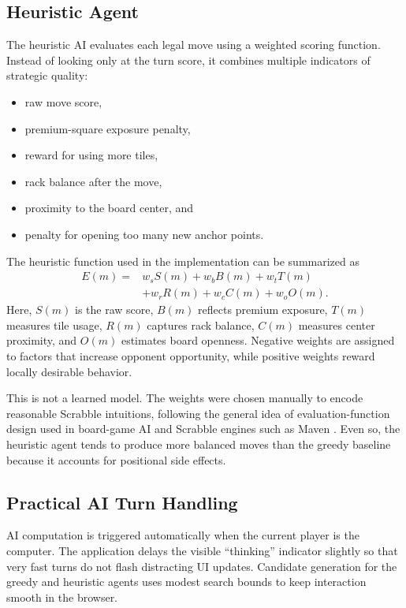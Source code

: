 \documentclass[conference]{IEEEtran}
\begin{document}
\subsection{Heuristic Agent}
The heuristic AI evaluates each legal move using a weighted scoring function. Instead of looking only at the turn score, it combines multiple indicators of strategic quality:
\begin{itemize}
\item raw move score,
\item premium-square exposure penalty,
\item reward for using more tiles,
\item rack balance after the move,
\item proximity to the board center, and
\item penalty for opening too many new anchor points.
\end{itemize}

The heuristic function used in the implementation can be summarized as
\begin{align}
E(m) ={}& w_s S(m) + w_b B(m) + w_t T(m) \nonumber\\
&+ w_r R(m) + w_c C(m) + w_o O(m).
\end{align}
Here, $S(m)$ is the raw score, $B(m)$ reflects premium exposure, $T(m)$ measures tile usage, $R(m)$ captures rack balance, $C(m)$ measures center proximity, and $O(m)$ estimates board openness. Negative weights are assigned to factors that increase opponent opportunity, while positive weights reward locally desirable behavior.

This is not a learned model. The weights were chosen manually to encode reasonable Scrabble intuitions, following the general idea of evaluation-function design used in board-game AI and Scrabble engines such as Maven \cite{sheppard2002world}. Even so, the heuristic agent tends to produce more balanced moves than the greedy baseline because it accounts for positional side effects.

\subsection{Practical AI Turn Handling}
AI computation is triggered automatically when the current player is the computer. The application delays the visible ``thinking'' indicator slightly so that very fast turns do not flash distracting UI updates. Candidate generation for the greedy and heuristic agents uses modest search bounds to keep interaction smooth in the browser.
\end{document}
